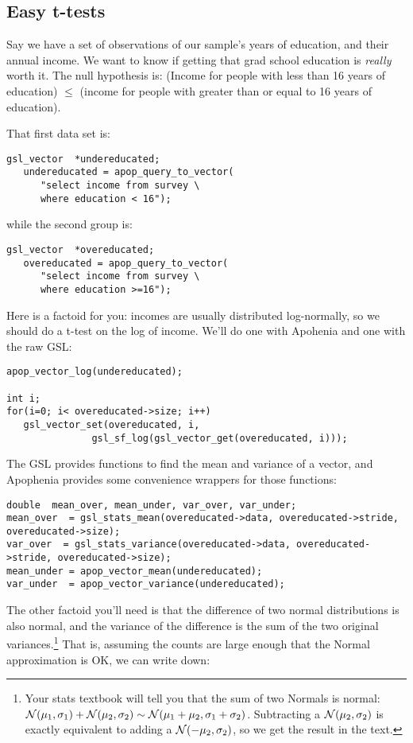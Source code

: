 \subsection{Easy t-tests}
Say we have a set of observations of our sample's years of education, and their annual income. We want to
know if getting that grad school education is {\it really} worth it. The null hypothesis is: (Income for
people with less than 16 years of education) $\leq$ (income for people with greater than or equal to 16 years
of education).

That first data set is:
\begin{lstlisting}
gsl_vector	*undereducated;
   undereducated = apop_query_to_vector(
      "select income from survey \
      where education < 16");
\end{lstlisting}
while the second group is:
\begin{lstlisting}
gsl_vector	*overeducated;
   overeducated = apop_query_to_vector(
      "select income from survey \
      where education >=16");
\end{lstlisting}

Here is a factoid for you: incomes are usually distributed log-normally, so we should do a t-test on the
log of income. We'll do one with Apohenia and one with the raw GSL:
\begin{lstlisting}
apop_vector_log(undereducated);

int i;
for(i=0; i< overeducated->size; i++)
   gsl_vector_set(overeducated, i, 
               gsl_sf_log(gsl_vector_get(overeducated, i)));
\end{lstlisting}

The GSL 
provides functions to find the mean and variance of a vector, and 
Apophenia provides some convenience wrappers for those functions:

\begin{lstlisting}
double	mean_over, mean_under, var_over, var_under;
mean_over  = gsl_stats_mean(overeducated->data, overeducated->stride, overeducated->size);
var_over  = gsl_stats_variance(overeducated->data, overeducated->stride, overeducated->size);
mean_under = apop_vector_mean(undereducated);
var_under  = apop_vector_variance(undereducated);
\end{lstlisting}

The other factoid you'll need is that the difference of two normal
distributions is also normal, and the variance of the difference is
the sum of the two original variances.\footnote{Your stats textbook
will tell you that the sum of two Normals is normal: ${\cal N}(\mu_1,
\sigma_1) + {\cal N}(\mu_2, \sigma_2) \sim {\cal N}(\mu_1 + \mu_2,
\sigma_1 + \sigma_2)$. Subtracting a ${\cal N}(\mu_2, \sigma_2)$
is exactly equivalent to adding a ${\cal N}(-\mu_2, \sigma_2)$, so we
get the result in the text.} That is, assuming the counts are large
enough that the Normal approximation is OK, we can write down:

